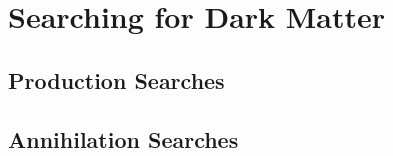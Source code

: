 \section{Searching for Dark Matter}


\subsection{Production Searches}


\subsection{Annihilation Searches}


